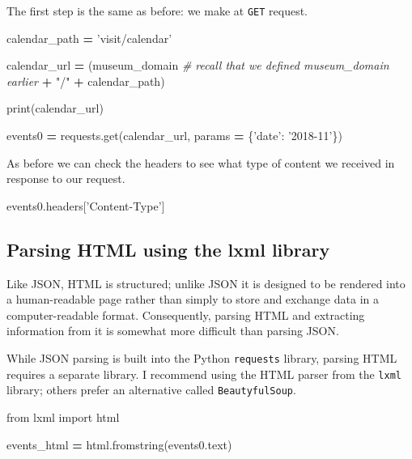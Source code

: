 \documentclass[]{book}
\newenvironment{Shaded}{\begin{snugshade}}{\end{snugshade}}
\newcommand{\BuiltInTok}[1]{#1}
\newcommand{\CommentTok}[1]{\textcolor[rgb]{0.56,0.35,0.01}{\textit{#1}}}
\newcommand{\ImportTok}[1]{#1}
\newcommand{\NormalTok}[1]{#1}
\newcommand{\OperatorTok}[1]{\textcolor[rgb]{0.81,0.36,0.00}{\textbf{#1}}}
\newcommand{\StringTok}[1]{\textcolor[rgb]{0.31,0.60,0.02}{#1}}
\begin{document}
The first step is the same as before: we make at \texttt{GET} request.

\begin{Shaded}
\begin{Highlighting}[]
\NormalTok{calendar_path }\OperatorTok{=} \StringTok{'visit/calendar'}

\NormalTok{calendar_url }\OperatorTok{=}\NormalTok{ (museum_domain }\CommentTok{# recall that we defined museum_domain earlier}
                  \OperatorTok{+} \StringTok{"/"}
                  \OperatorTok{+}\NormalTok{ calendar_path)}

\BuiltInTok{print}\NormalTok{(calendar_url)}

\NormalTok{events0 }\OperatorTok{=}\NormalTok{ requests.get(calendar_url, params }\OperatorTok{=}\NormalTok{ \{}\StringTok{'date'}\NormalTok{: }\StringTok{'2018-11'}\NormalTok{\})}
\end{Highlighting}
\end{Shaded}

As before we can check the headers to see what type of content we
received in response to our request.

\begin{Shaded}
\begin{Highlighting}[]
\NormalTok{events0.headers[}\StringTok{'Content-Type'}\NormalTok{]}
\end{Highlighting}
\end{Shaded}

\hypertarget{parsing-html-using-the-lxml-library}{%
\subsection{Parsing HTML using the lxml library}\label{parsing-html-using-the-lxml-library}}

Like JSON, HTML is structured; unlike JSON it is designed to be
rendered into a human-readable page rather than simply to store and
exchange data in a computer-readable format. Consequently, parsing
HTML and extracting information from it is somewhat more difficult
than parsing JSON.

While JSON parsing is built into the Python \texttt{requests} library, parsing
HTML requires a separate library. I recommend using the HTML parser
from the \texttt{lxml} library; others prefer an alternative called
\texttt{BeautyfulSoup}.

\begin{Shaded}
\begin{Highlighting}[]
\ImportTok{from}\NormalTok{ lxml }\ImportTok{import}\NormalTok{ html}

\NormalTok{events_html }\OperatorTok{=}\NormalTok{ html.fromstring(events0.text)}
\end{Highlighting}
\end{Shaded}
\end{document}
